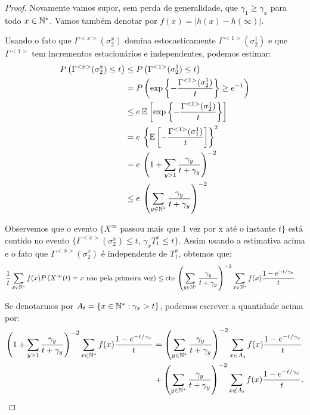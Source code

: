 \begin{proof}
  Novamente vamos supor, sem perda de generalidade, que $\gamma_1 \geq
  \gamma_x$ para todo $x \in {\mathbb{N^*}}$. Vamos também denotar por $f(x) =
  |h(x) - h(\infty)|$.

  Usando o fato que $\Gamma^{<x>} (\sigma^x_2)$ domina
  estocasticamente $\Gamma^{<1>} (\sigma^1_2)$ e que $\Gamma^{<1>}$
  tem incrementos estacionários e independentes, podemos estimar:
  \begin{align*}
    P \left( \Gamma^{<x>} (\sigma^x_2) \leq t \right)
    &\leq P \left( \Gamma^{<1>} (\sigma^1_2) \leq t \right)\\
    &= P \left( \exp \left\{
        -\frac{\Gamma^{<1>}(\sigma^1_2)}{t}
      \right\}
        \geq e^{-1} \right)\\
    &\leq e \:
    {\mathbb{E}} \left[ \exp \left\{
        -\frac{\Gamma^{<1>}(\sigma^1_2)}{t}
      \right\} \right]\\
    &= e \: \left\{ {\mathbb{E}} \left[  -\frac{\Gamma^{<1>}(\sigma^1_1)}{t}
      \right] \right\}^2 \\
    &= e \: \left( 1 + \sum_{y > 1} \frac{\gamma_y}{t +
        \gamma_y}  \right)^{-2}\\
    &\leq e \: \left( \sum_{y \in {\mathbb{N^*}}} \frac{\gamma_y}{t +
        \gamma_y}  \right)^{-2}
  \end{align*}

  Observemos que o evento $\{ X^\infty $ passou mais que 1 vez por x
  até o instante $t\}$ está contido no evento $\{ \Gamma^{<x>}
  (\sigma^x_2) \leq t,\, \gamma_x T^x_1 \leq t\}$. Assim usando a
  estimativa acima e o fato que $\Gamma^{<x>} (\sigma^x_2)$ é
  independente de $T_1^x$, obtemos que:
  \begin{align*}
    \frac{1}{t} \sum_{x\in{\mathbb{N^*}}} f(x) P\left( X^\infty(t) = x \text{ não
        pela primeira vez}\right) 
    &\leq \mathrm{cte} \: \left( \sum_{y \in {\mathbb{N^*}}} \frac{\gamma_y}{t +
        \gamma_y}  \right)^{-2} \sum_{x \in {\mathbb{N^*}}} f(x) \frac{1 -
      e^{-t/\gamma_x}}{t} .
  \end{align*}

  Se denotarmos por $A_t = \{ x \in {\mathbb{N^*}}: \gamma_x > t \}$,
  podemos escrever a quantidade acima por:
  \begin{align}
    \label{eq:erro-gerador-partes}
    \left( 1 + \sum_{y > 1} \frac{\gamma_y}{t + \gamma_y} \right)^{-2}
    \sum_{x \in {\mathbb{N^*}}} f(x) \frac{1 - e^{-t/\gamma_x}}{t}
    &= \left( \sum_{y \in {\mathbb{N^*}}} \frac{\gamma_y}{t + \gamma_y} \right)^{-2}
    \sum_{x \in A_t} f(x) \frac{1 - e^{-t/\gamma_x}}{t}\\
    &+ \left( \sum_{y \in {\mathbb{N^*}}} \frac{\gamma_y}{t + \gamma_y} \right)^{-2}
    \sum_{x \not\in A_t} f(x) \frac{1 - e^{-t/\gamma_x}}{t} .\notag
  \end{align}


\end{proof}
